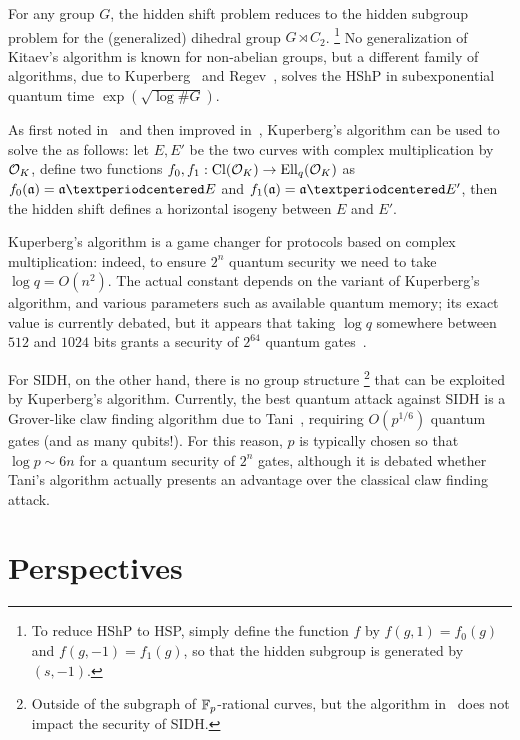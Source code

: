 \documentclass[b5layout]{hdr}
\begin{document}
For any group $G$, the hidden shift problem reduces to the hidden
subgroup problem for the (generalized) dihedral group $G\rtimes C_2$.%
\footnote{To reduce HShP to HSP, simply define the function $f$ by
  $f(g,1) = f_0(g)$ and $f(g,-1) = f_1(g)$, so that the hidden
  subgroup is generated by $(s,-1)$.} %
No generalization of Kitaev's algorithm is known for non-abelian
groups, but a different family of algorithms, due to
Kuperberg~\cite{Kup,Kuperberg2013} and Regev~\cite{regev04}, solves
the HShP in subexponential quantum time $\exp(\sqrt{\log\#G})$. %

As first noted in~\cite{childs2014constructing} and then improved
in~\cite{cryptoeprint:2018:537,BIJ18,Jao-etal-kuperberg-2018}, Kuperberg's algorithm
can be used to solve the  as follows: let $E,E'$ be
the two curves with complex multiplication by $\mathcal{O}_K$, define two
functions $f_0,f_1:\operatorname{Cl}(\mathcal{O}_K)\to\operatorname{Ell}_q(\mathcal{O}_K)$ as $f_0(\a)=\a·E$ and
$f_1(\a)=\a·E'$, then the hidden shift defines a horizontal isogeny
between $E$ and $E'$. %

Kuperberg's algorithm is a game changer for protocols based on complex
multiplication: indeed, to ensure $2^n$ quantum security we need to
take $\log q=O(n^2)$. %
The actual constant depends on the variant of Kuperberg's algorithm,
and various parameters such as available quantum memory; its exact
value is currently debated, but it appears that taking $\log q$
somewhere between $512$ and $1024$ bits grants a security of $2^{64}$
quantum gates~\cite{10.1007/978-3-030-03332-3_15,10.1007/978-3-030-03332-3_14,cryptoeprint:2018:537,cryptoeprint:2018:1059}.

For SIDH, on the other hand, there is no group structure%
\footnote{Outside of the subgraph of $\mathbb{F}_p$-rational curves, but the
  algorithm in~\cite{biasse2014quantum} does not impact the security
  of SIDH.} %
that can be exploited by Kuperberg's algorithm. %
Currently, the best quantum attack against SIDH is a Grover-like claw
finding algorithm due to Tani~\cite{tani2009claw}, requiring
$O(p^{1/6})$ quantum gates (and as many qubits!). %
For this reason, $p$ is typically chosen so that $\log p\sim 6n$ for a
quantum security of $2^n$ gates, although it is debated whether Tani's
algorithm actually presents an advantage over the classical claw
finding attack.%


\section{Perspectives}
\end{document}
